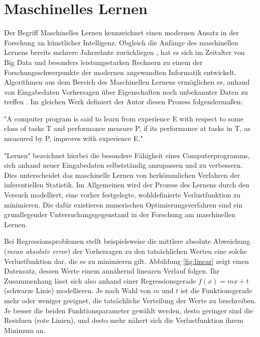 \section{Maschinelles Lernen}
Der Begriff Maschinelles Lernen kennzeichnet einen modernen Ansatz in der Forschung an künstlicher Intelligenz. Obgleich die Anfänge des maschinellen Lernens bereits mehrere Jahrzehnte zurückliegen \citep{samuelStudiesMachineLearning1959, nilsson1965learning}, hat es sich im Zeitalter von Big Data und besonders leistungsstarken Rechnern zu einem der Forschungsschwerpunkte der modernen angewandten Informatik entwickelt. Algorithmen aus dem Bereich des Maschinellen Lernens ermöglichen es, anhand von Eingabedaten Vorhersagen über Eigenschaften noch unbekannter Daten zu treffen \citep{mitchellMachineLearning1997}. Im gleichen Werk definiert der Autor diesen Prozess folgendermaßen:

\begin{itquote}
    {\foreignlanguage{english}{"A computer program is said to learn from experience E with respect to some class of tasks T and performance measure P, if its performance at tasks in T, as measured by P, improves with experience E."}}
\end{itquote}

"Lernen" bezeichnet hierbei die besondere Fähigkeit eines Computerprogramms, sich anhand neuer Eingabedaten selbstständig anzupassen und zu verbessern. Dies unterscheidet das maschinelle Lernen von herkömmlichen Verfahren der inferentiellen Statistik. Im Allgemeinen wird der Prozess des Lernens durch den Versuch modelliert, eine vorher festgelegte, wohldefinierte Verlustfunktion zu minimieren. %
Die dafür existieren numerischen Optimierungsverfahren sind ein grundlegender Untersuchungsgegenstand in der Forschung am maschinellen Lernen.

Bei Regressionsproblemen stellt beispielsweise die mittlere absolute Abweichung (\textit{mean absolute error}) der Vorhersagen zu den tatsächlichen Werten eine solche Verlustfunktion dar, die es zu minimieren gilt. Abbildung \ref{fig:linear} zeigt einen Datensatz, dessen Werte einem annähernd linearen Verlauf folgen. Ihr Zusammenhang lässt sich also anhand einer Regressionsgerade $f(x) = mx + t$ (schwarze Linie) modellieren. Je nach Wahl von $m$ und $t$ ist die Funktionsgerade mehr oder weniger geeignet, die tatsächliche Verteilung der Werte zu beschreiben. Je besser die beiden Funktionsparameter gewählt werden, desto geringer sind die Residuen (rote Linien), und desto mehr nähert sich die Verlustfunktion ihrem Minimum an.

